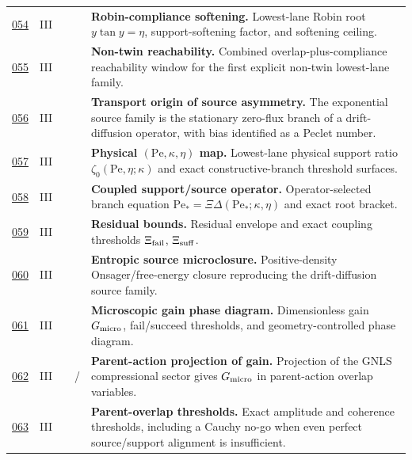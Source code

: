 {\begin{longtable}{@{}L{0.055\textwidth}L{0.075\textwidth}L{0.145\textwidth}L{0.235\textwidth}L{0.43\textwidth}@{}}
\addlinespace
\hyperref[stage:054]{054} & III &  & \StatusExactClosure{} & \textbf{Robin-compliance softening.} Lowest-lane Robin root \(y\tan y=\eta\), support-softening factor, and softening ceiling. \\
\addlinespace
\hyperref[stage:055]{055} & III &  & \StatusExactClosure{} & \textbf{Non-twin reachability.} Combined overlap-plus-compliance reachability window for the first explicit non-twin lowest-lane family. \\
\addlinespace
\hyperref[stage:056]{056} & III &  & \StatusExactClosure{} & \textbf{Transport origin of source asymmetry.} The exponential source family is the stationary zero-flux branch of a drift-diffusion operator, with bias identified as a Peclet number. \\
\addlinespace
\hyperref[stage:057]{057} & III &  & \StatusExactClosure{} & \textbf{Physical \((\mathrm{Pe},\kappa,\eta)\) map.} Lowest-lane physical support ratio \(\zeta_0(\mathrm{Pe},\eta;\kappa)\) and exact constructive-branch threshold surfaces. \\
\addlinespace
\hyperref[stage:058]{058} & III &  & \StatusExactClosure{} & \textbf{Coupled support/source operator.} Operator-selected branch equation \(\mathrm{Pe}_*=\Xi\Delta(\mathrm{Pe}_*;\kappa,\eta)\) and exact root bracket. \\
\addlinespace
\hyperref[stage:059]{059} & III &  & \StatusExactClosure{} & \textbf{Residual bounds.} Residual envelope and exact coupling thresholds \(\Xi_{\rm fail}\), \(\Xi_{\rm suff}\). \\
\addlinespace
\hyperref[stage:060]{060} & III &  & \StatusExactClosure{} & \textbf{Entropic source microclosure.} Positive-density Onsager/free-energy closure reproducing the drift-diffusion source family. \\
\addlinespace
\hyperref[stage:061]{061} & III &  & \StatusExactClosure{} & \textbf{Microscopic gain phase diagram.} Dimensionless gain \(G_{\rm micro}\), fail/succeed thresholds, and geometry-controlled phase diagram. \\
\addlinespace
\hyperref[stage:062]{062} & III &  & \StatusExact{} / \StatusReduced{} & \textbf{Parent-action projection of gain.} Projection of the GNLS compressional sector gives \(G_{\rm micro}\) in parent-action overlap variables. \\
\addlinespace
\hyperref[stage:063]{063} & III &  & \StatusExactClosure{} & \textbf{Parent-overlap thresholds.} Exact amplitude and coherence thresholds, including a Cauchy no-go when even perfect source/support alignment is insufficient. \\

\end{longtable}}
